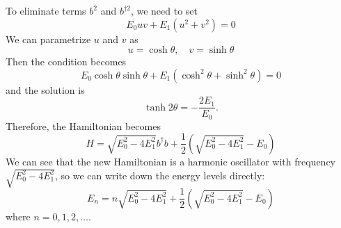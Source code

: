 \documentclass{article}
\begin{document}
To eliminate terms $b^2$ and $b^{\dagger 2}$, we need to set
\begin{equation}
    E_0uv+E_1(u^2+v^2)=0
\end{equation}
We can parametrize $u$ and $v$ as
\begin{equation}
    u=\cosh\theta, \quad v=\sinh\theta
\end{equation}
Then the condition becomes
\begin{equation}
    E_0\cosh\theta\sinh\theta+E_1(\cosh^2\theta+\sinh^2\theta)=0
\end{equation}
and the solution is
\begin{equation}
    \tanh 2\theta=-\frac{2E_1}{E_0}.
\end{equation}
Therefore, the Hamiltonian becomes
\begin{equation}
    H=\sqrt{E_0^2-4E_1^2}b^\dagger b+\frac{1}{2}(\sqrt{E_0^2-4E_1^2}-E_0)
\end{equation}
We can see that the new Hamiltonian is a harmonic oscillator with frequency $\sqrt{E_0^2-4E_1^2}$, so we can write down the energy levels directly:
\begin{equation}
    E_n=n\sqrt{E_0^2-4E_1^2}+\frac{1}{2}(\sqrt{E_0^2-4E_1^2}-E_0)
\end{equation}
where $n=0,1,2,\ldots$.
\end{document}
